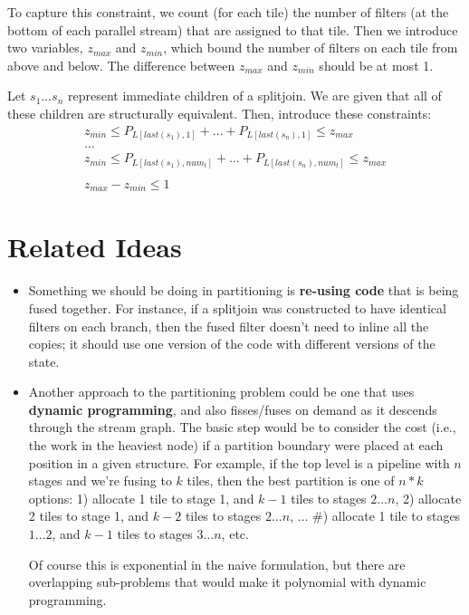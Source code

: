 \documentclass[12pt]{article}
\begin{document}
\begin{itemize}
    To capture this constraint, we count (for each tile) the number of
    filters (at the bottom of each parallel stream) that are assigned
    to that tile.  Then we introduce two variables, $z_{max}$ and
    $z_{min}$, which bound the number of filters on each tile from
    above and below.  The difference between $z_{max}$ and $z_{min}$
    should be at most 1.

    Let $s_1 \dots s_n$ represent immediate children of a splitjoin.
    We are given that all of these children are structurally
    equivalent.  Then, introduce these constraints:
    \[
    \begin{array}{c}
      z_{min} \le P_{L[last(s_1),1]} + \dots + P_{L[last(s_n),1]} \le z_{max} \\
      \dots \\
      z_{min} \le P_{L[last(s_1),num_t]} + \dots + P_{L[last(s_n),num_t]} \le z_{max} \\
      ~ \\
      z_{max} - z_{min} \le 1
    \end{array}
    \]

\end{itemize}

  \section{Related Ideas}

  \begin{itemize}

    \item Something we should be doing in partitioning is {\bf
    re-using code} that is being fused together.  For instance, if a
    splitjoin was constructed to have identical filters on each
    branch, then the fused filter doesn't need to inline all the
    copies; it should use one version of the code with different
    versions of the state.

    \item Another approach to the partitioning problem could be one
    that uses {\bf dynamic programming}, and also fisses/fuses on
    demand as it descends through the stream graph.  The basic step
    would be to consider the cost (i.e., the work in the heaviest
    node) if a partition boundary were placed at each position in a
    given structure.  For example, if the top level is a pipeline with
    $n$ stages and we're fusing to $k$ tiles, then the best partition
    is one of $n*k$ options: 1) allocate 1 tile to stage 1, and $k-1$
    tiles to stages $2 \dots n$, 2) allocate 2 tiles to stage 1, and
    $k-2$ tiles to stages $2 \dots n$, $\dots$ \#) allocate 1 tile to
    stages $1 \dots 2$, and $k-1$ tiles to stages $3 \dots n$, etc.

    Of course this is exponential in the naive formulation, but there
    are overlapping sub-problems that would make it polynomial with
    dynamic programming.

  \end{itemize}
\end{document}
